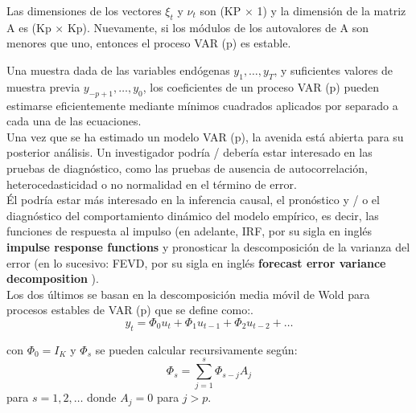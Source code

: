 	Las dimensiones de los vectores $\xi_t$ y $\nu_t$ son (KP × 1) y la dimensión de la matriz A es (Kp × Kp). Nuevamente, si los m\'odulos de los autovalores de A son menores que uno, entonces el proceso VAR (p) es estable.
	
	
	
	Una muestra dada de las variables end\'ogenas $y_1,\dots{}, y_T$, y suficientes valores de muestra previa $y_{-p + 1},\dots{}, y_0$, los coeficientes de un proceso VAR (p) pueden estimarse eficientemente mediante m\'{i}nimos cuadrados aplicados por separado a cada una de las ecuaciones.\\
	
	Una vez que se ha estimado un modelo VAR (p), la avenida est\'a abierta para su posterior an\'alisis. Un investigador podr\'{i}a / deber\'{i}a estar interesado en las pruebas de diagn\'ostico, como las pruebas de ausencia de autocorrelaci\'on, heterocedasticidad o no normalidad en el t\'ermino de error.\\
	\'El podr\'{i}a estar m\'as interesado en la inferencia causal, el pron\'ostico y / o el diagn\'ostico del comportamiento din\'amico del modelo emp\'{i}rico, es decir, las funciones de respuesta al impulso (en adelante, IRF, por su sigla en ingl\'es \textbf{impulse response functions} y pronosticar la descomposición de la varianza del error (en lo sucesivo: FEVD, por su sigla en ingl\'es \textbf{forecast error variance decomposition }). \\
	
	Los dos \'ultimos se basan en la descomposici\'on media m\'ovil de Wold para procesos estables de VAR (p) que se define como:.
	\begin{equation*}
	y_t = \Phi_0u_t + \Phi_1u_{t-1} + \Phi_2u_{t-2} + \dots{}
	\end{equation*}
	
	con $\Phi_0 = I_K$ y $\Phi_s$ se pueden calcular recursivamente según: 
	\begin{equation*}
	\Phi_s = \sum_{j=1}^{s}\Phi_{s-j}A_j 
	\end{equation*}
	para $s = 1,2, \dots{}$ donde $A_j = 0$ para $j > p$.\\
	
